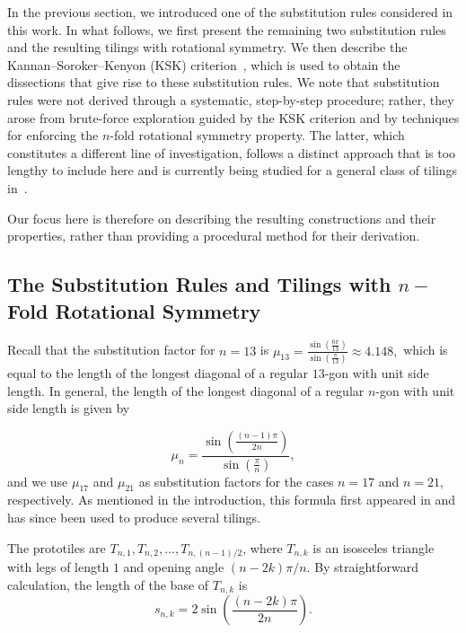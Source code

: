 \noindent In the previous section, we introduced one of the substitution rules considered in this work. In what follows, we first present the remaining two substitution rules and the resulting tilings with rotational symmetry. We then describe the Kannan–Soroker–Kenyon (KSK) criterion~\cite{KanSor92, Ken93}, which is used to obtain the dissections that give rise to these substitution rules. We note that substitution rules were not derived through a systematic, step-by-step procedure; rather, they arose from brute-force exploration guided by the KSK criterion and by techniques for enforcing the \(n\)-fold rotational symmetry property. The latter, which constitutes a different line of investigation, follows a distinct approach that is too lengthy to include here and is currently being studied for a general class of tilings in~\cite{SayDe}.  

Our focus here is therefore on describing the resulting constructions and their properties, rather than providing a procedural method for their derivation.


\subsection{The Substitution Rules and Tilings with \(n-\)Fold Rotational Symmetry}
\noindent Recall that the substitution factor for \(n=13\) is  \(\mu_{13} = \frac{\sin\left(\frac{6\pi}{13}\right)}{\sin\left(\frac{\pi}{13}\right)} \approx 4.148,\) which is equal to the length of the longest diagonal of a regular \(13\)-gon with unit side length. In general, the length of the longest diagonal of a regular \(n\)-gon with unit side length is given by  

\begin{equation}
\mu_n = \frac{\sin\left( \frac{(n-1)\pi}{2n} \right)}{\sin\left( \frac{\pi}{n} \right)}, 
\label{eq:subfac}
\end{equation}  
\noindent and we use \(\mu_{17}\) and \(\mu_{21}\) as substitution factors for the cases \(n = 17\) and \(n = 21\), respectively. As mentioned in the introduction, this formula first appeared in \cite{NisDanz96} and has since been used to produce several tilings.

The prototiles are $T_{n,1}, T_{n,2}, \dots, T_{n,(n-1)/2}$, where $T_{n,k}$ is an isosceles triangle with legs of length $1$ and opening angle $(n-2k)\pi/n$. By straightforward calculation, the length of the base of $T_{n,k}$ is
\[
s_{n,k} = 2 \sin\left( \frac{(n-2k)\pi}{2n} \right).
\]

